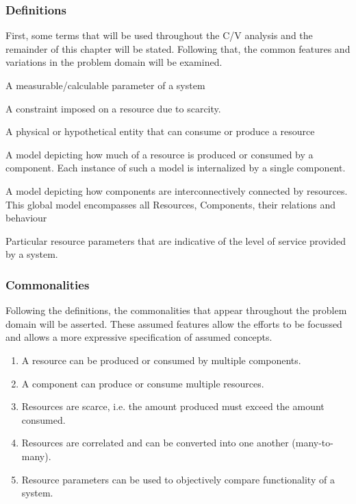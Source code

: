 \subsubsection{Definitions}
First, some terms that will be used throughout the C/V analysis and the remainder of this chapter will be stated. Following that, the common features and variations in the problem domain will be examined.
\begin{description}[style=nextline]
\nospace
\item[Resource] A measurable/calculable parameter of a system
\item[Resource constraint] A constraint imposed on a resource due to scarcity.
\item[Component] A physical or hypothetical entity that can consume or produce a resource
\item[Resource Utilization Model (RUM)] A model depicting how much of a resource is produced or consumed by a component. Each instance of such a model is internalized by a single component.
\item[Resource Distribution Model (RDM)] A model depicting how components are interconnectively connected by resources. This global model encompasses all Resources, Components, their relations and behaviour
\item[QoS parameter] Particular resource parameters that are indicative of the level of service provided by a system.
\end{description}
\subsubsection{Commonalities}
Following the definitions, the commonalities that appear throughout the problem domain will be asserted. These assumed features allow the efforts to be focussed and allows a more expressive specification of assumed concepts.
\begin{enumerate}[label=C\rdmid .\arabic*]
\nospace
\item \label{c:1resource_multiplex} A resource can be produced or consumed by multiple components.
\item \label{c:2component_multiplex} A component can produce or consume multiple resources.
\item \label{c:3scarce} Resources are scarce, i.e. the amount produced must exceed the amount consumed.
\item \label{c:4res_transf} Resources are correlated and can be converted into one another (many-to-many).
\item \label{c:5optimize} Resource parameters can be used to objectively compare functionality of a system.
\end{enumerate}

